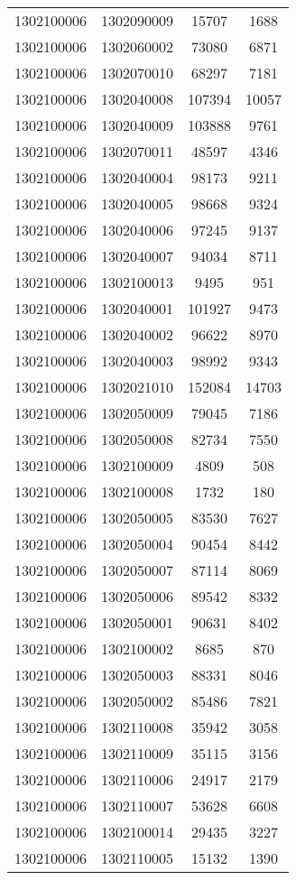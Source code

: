 \begin{longtable}{llcc}
1302100006 & 1302090009 & 15707 & 1688\\
1302100006 & 1302060002 & 73080 & 6871\\
1302100006 & 1302070010 & 68297 & 7181\\
1302100006 & 1302040008 & 107394 & 10057\\
1302100006 & 1302040009 & 103888 & 9761\\
1302100006 & 1302070011 & 48597 & 4346\\
1302100006 & 1302040004 & 98173 & 9211\\
1302100006 & 1302040005 & 98668 & 9324\\
1302100006 & 1302040006 & 97245 & 9137\\
1302100006 & 1302040007 & 94034 & 8711\\
1302100006 & 1302100013 & 9495 & 951\\
1302100006 & 1302040001 & 101927 & 9473\\
1302100006 & 1302040002 & 96622 & 8970\\
1302100006 & 1302040003 & 98992 & 9343\\
1302100006 & 1302021010 & 152084 & 14703\\
1302100006 & 1302050009 & 79045 & 7186\\
1302100006 & 1302050008 & 82734 & 7550\\
1302100006 & 1302100009 & 4809 & 508\\
1302100006 & 1302100008 & 1732 & 180\\
1302100006 & 1302050005 & 83530 & 7627\\
1302100006 & 1302050004 & 90454 & 8442\\
1302100006 & 1302050007 & 87114 & 8069\\
1302100006 & 1302050006 & 89542 & 8332\\
1302100006 & 1302050001 & 90631 & 8402\\
1302100006 & 1302100002 & 8685 & 870\\
1302100006 & 1302050003 & 88331 & 8046\\
1302100006 & 1302050002 & 85486 & 7821\\
1302100006 & 1302110008 & 35942 & 3058\\
1302100006 & 1302110009 & 35115 & 3156\\
1302100006 & 1302110006 & 24917 & 2179\\
1302100006 & 1302110007 & 53628 & 6608\\
1302100006 & 1302100014 & 29435 & 3227\\
1302100006 & 1302110005 & 15132 & 1390\\

\end{longtable}

